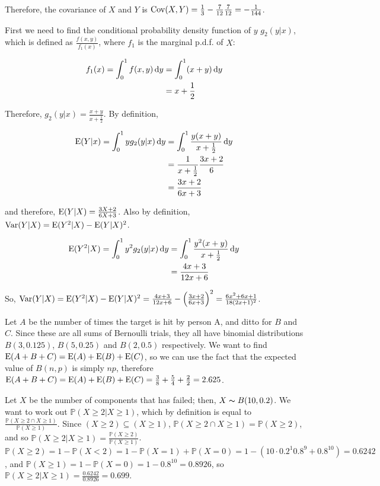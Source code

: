 Therefore, the covariance of $X$ and $Y$ is $\mathrm{Cov}(X, Y) = \frac{1}{3} - \frac{7}{12}\frac{7}{12} = -\frac{1}{144}$.


First we need to find the conditional probability density function of $y$ $g_2(y|x)$, which is defined as $\frac{f(x, y)}{f_1(x)}$, where $f_1$ is the marginal p.d.f. of $X$:

\begin{align*}
  f_1(x) = \int_0^1 f(x, y) \mathop{}\!\mathrm{d} y &= \int_0^1 (x + y) \mathop{}\!\mathrm{d} y \\
  &= x + \frac{1}{2}
\end{align*}

Therefore, $g_2(y|x) = \frac{x + y}{x + \frac{1}{2}}$. By definition,

\begin{align*}
  \mathrm{E}(Y|x) = \int_0^1 y g_2(y|x) \mathop{}\!\mathrm{d} y &= \int_0^1 \frac{y(x + y)}{x + \frac{1}{2}} \mathop{}\!\mathrm{d} y \\
  &= \frac{1}{x + \frac{1}{2}} \frac{3x + 2}{6} \\
  &= \frac{3x + 2}{6x + 3}
\end{align*}

and therefore, $\mathrm{E}(Y|X) = \frac{3X + 2}{6X + 3}$. Also by definition, $\mathrm{Var}(Y|X) = \mathrm{E}(Y^2|X) - \mathrm{E}(Y|X)^2$.

\begin{align*}
  \mathrm{E}(Y^2|X) = \int_0^1 y^2 g_2(y|x) \mathop{}\!\mathrm{d} y &= \int_0^1 \frac{y^2(x + y)}{x + \frac{1}{2}} \mathop{}\!\mathrm{d} y \\
  &= \frac{4x + 3}{12x + 6}
\end{align*}

So, $\mathrm{Var}(Y|X) = \mathrm{E}(Y^2|X) - \mathrm{E}(Y|X)^2 = \frac{4x + 3}{12x + 6} - \left(\frac{3x + 2}{6x + 3}\right)^2 = \frac{6x^2 + 6x + 1}{18(2x + 1)^2}$.


Let $A$ be the number of times the target is hit by person A, and ditto for $B$ and $C$. Since these are all sums of Bernoulli trials, they all have binomial distributions $B(3, 0.125)$, $B(5, 0.25)$ and $B(2, 0.5)$ respectively. We want to find $\mathrm{E}(A + B + C) = \mathrm{E}(A) + \mathrm{E}(B) + \mathrm{E}(C)$, so we can use the fact that the expected value of $B(n, p)$ is simply $np$, therefore $\mathrm{E}(A + B + C) = \mathrm{E}(A) + \mathrm{E}(B) + \mathrm{E}(C) = \frac{3}{8} + \frac{5}{4} + \frac{2}{2} = 2.625$.


Let $X$ be the number of components that has failed; then, $X \thicksim B(10, 0.2)$. We want to work out $\mathbb{P}(X \geq 2 | X \geq 1)$, which by definition is equal to $\frac{\mathbb{P}(X \geq 2 \cap X \geq 1)}{\mathbb{P}(X \geq 1)}$. Since $(X \geq 2) \subseteq (X \geq 1)$, $\mathbb{P}(X \geq 2 \cap X \geq 1) = \mathbb{P}(X \geq 2)$, and so $\mathbb{P}(X \geq 2 | X \geq 1) = \frac{\mathbb{P}(X \geq 2)}{\mathbb{P}(X \geq 1)}$. $\mathbb{P}(X \geq 2) = 1 - \mathbb{P}(X < 2) = 1 - \mathbb{P}(X = 1) + \mathbb{P}(X = 0) = 1 - (10 \cdot 0.2^1 0.8^9 + 0.8^{10}) = 0.6242$, and $\mathbb{P}(X \geq 1) = 1 - \mathbb{P}(X = 0) = 1 - 0.8^{10} = 0.8926$, so $\mathbb{P}(X \geq 2 | X \geq 1) = \frac{0.6242}{0.8926} = 0.699$.

